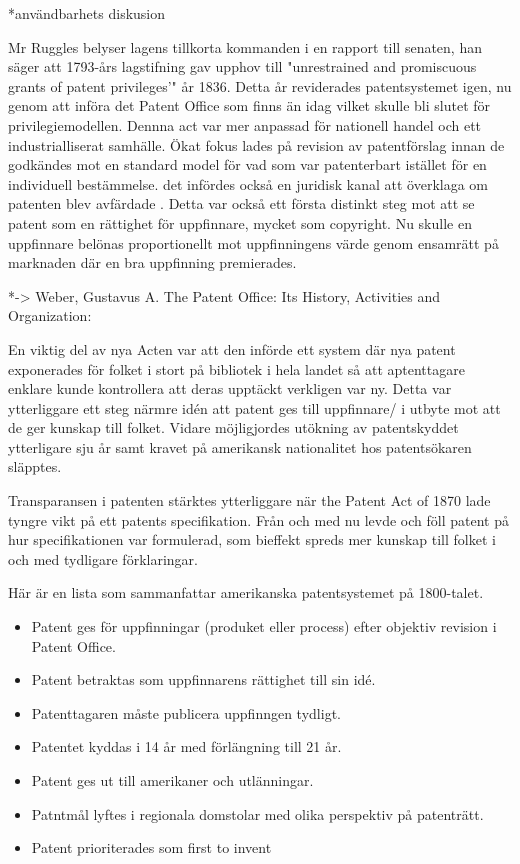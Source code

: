 *användbarhets diskusion

Mr Ruggles belyser lagens tillkorta kommanden i en rapport till senaten, han säger att 1793-års lagstifning gav upphov till "unrestrained and promiscuous grants of patent privileges’" \cite{ruggles} år 1836. 
Detta år reviderades patentsystemet igen, nu genom att införa det Patent
Office som finns än idag\cite{nard} vilket skulle bli slutet för privilegiemodellen\cite{bracha}. Dennna act var mer anpassad för nationell handel och ett industrialliserat samhälle. Ökat fokus lades på revision av patentförslag innan
de godkändes mot en standard model för vad som var patenterbart istället för en individuell bestämmelse\cite{bracha}. det infördes också en juridisk kanal att överklaga om patenten blev avfärdade \cite{nard}. Detta var också ett första distinkt steg mot att se patent som en rättighet för uppfinnare, mycket som copyright\cite{bracha}. Nu skulle en uppfinnare belönas proportionellt mot uppfinningens värde genom ensamrätt på marknaden där en bra uppfinning premierades.

*-> Weber, Gustavus A. The Patent Office: Its History, Activities and Organization:

En viktig del av nya Acten var att den införde ett system där nya patent exponerades för folket i stort
på bibliotek i hela landet så att aptenttagare enklare kunde kontrollera att deras upptäckt verkligen
var ny\cite{watson}. Detta var ytterliggare ett steg närmre idén att patent ges till uppfinnare/ i
utbyte mot att de ger kunskap till folket. Vidare möjligjordes utökning av patentskyddet ytterligare sju
år \cite{watson} samt kravet på amerikansk nationalitet hos patentsökaren släpptes.

Transparansen i patenten stärktes ytterliggare när the Patent Act of 1870 lade tyngre vikt på ett
patents specifikation. Från och med nu levde och föll patent på hur specifikationen var formulerad, som
bieffekt spreds mer kunskap till folket i och med tydligare förklaringar\cite{nard}.

Här är en lista som sammanfattar amerikanska patentsystemet på 1800-talet.
\begin{itemize}
	\item Patent ges för uppfinningar (produket eller process) efter objektiv revision i Patent Office.
	\item Patent betraktas som uppfinnarens rättighet till sin idé.
	\item Patenttagaren måste publicera uppfinngen tydligt.
	\item Patentet kyddas i 14 år med förlängning till 21 år.
	\item Patent ges ut till amerikaner och utlänningar.
	\item Patntmål lyftes i regionala domstolar med olika perspektiv på patenträtt.
	\item Patent prioriterades som first to invent
\end{itemize}


